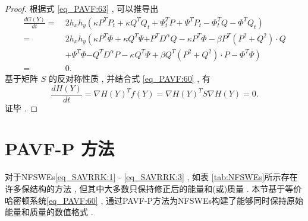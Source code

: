 \begin{proof}
	根据式 \eqref{eq_PAVF:63} , 可以推导出
	\begin{align}\label{eq_PAVF:64}
		\frac{d G(Y)}{d t}=&~2 h_{x} h_{y}\left(\kappa P^{T}P_t+\kappa Q^{T}Q_t+\Psi^{T}_t P+\Psi^{T}P_{t}-\varPhi^{T}_t Q-\varPhi^{T}Q_{t}\right)\nonumber\\
		=&~2 h_{x} h_{y}\left(\kappa P^{T}\varPhi+\kappa Q^{T}\Psi {+ P^{T}D^{\alpha}Q}-\kappa P^{T}\varPhi-\beta P^{T}\left( P^{2}+Q^{2}\right)\cdot Q\right . \nonumber\\
		&~\left . +\Psi^{T}\varPhi{-Q^{T}D^{\alpha}P}-\kappa Q^{T}\Psi+\beta Q^{T}\left( P^{2}+Q^{2}\right)\cdot P-\varPhi^{T}\Psi\right)\nonumber\\
		=&~0 . 
		\end{align}
		基于矩阵 $S$ 的反对称性质 , 并结合式 \eqref{eq_PAVF:60} , 有
		\begin{equation}\label{eq_PAVF:65}
		\frac{d H(Y)}{d t}=\nabla H(Y)^{T} f(Y)=\nabla H(Y)^{T} S \nabla H(Y)=0  . 
		\end{equation}
		证毕 . 
		\end{proof}

\section{PAVF-P 方法}\label{Section_PAVF: 3}
对于NFSWEs\eqref{eq_SAVRRK:1} - \eqref{eq_SAVRRK:3} , 如表 \ref{tab:NFSWEs}所示存在许多保结构的方法 , 但其中大多数只保持修正后的能量和(或)质量 . 
本节基于等价哈密顿系统\eqref{eq_PAVF:60} , 通过PAVF-P方法\cite{caiPartitionedAveragedVector2018}为NFSWEs构建了能够同时保持原始能量和质量的数值格式 . 

